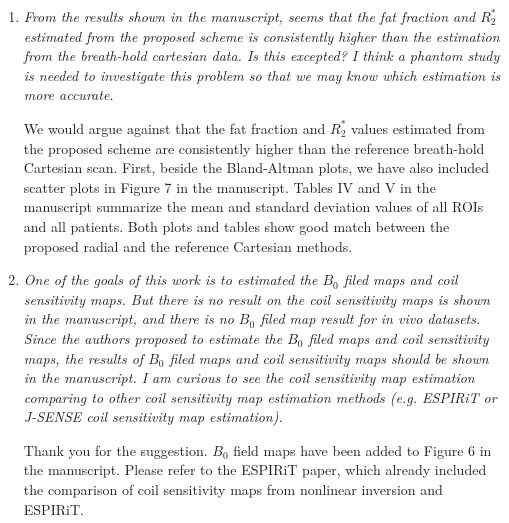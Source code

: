 \documentclass[a4paper,11pt]{report}
\begin{document}
\begin{enumerate}
	\item \textit{From the results shown in the manuscript, seems that the fat fraction and $R_2^*$ estimated from the proposed scheme is consistently higher than the estimation from the breath-hold cartesian data. Is this excepted? I think a phantom study is needed to investigate this problem so that we may know which estimation is more accurate.}

\hspace{1em} We would argue against that the fat fraction and $R_2^*$ values 
estimated from the proposed scheme are consistently higher than 
the reference breath-hold Cartesian scan. First, beside the Bland-Altman plots, 
we have also included scatter plots in Figure 7 in the manuscript. 
Tables IV and V in the manuscript summarize the mean and standard deviation values 
of all ROIs and all patients. 
Both plots and tables show good match between the proposed radial and the reference Cartesian methods.

	\item \textit{One of the goals of this work is to estimated the $B_0$ filed maps and coil sensitivity maps. But there is no result on the coil sensitivity maps is shown in the manuscript, and there is no $B_0$ filed map result for in vivo datasets. Since the authors proposed to estimate the $B_0$ filed maps and coil sensitivity maps, the results of $B_0$ filed maps and coil sensitivity maps should be shown in the manuscript. I am curious to see the coil sensitivity map estimation comparing to other coil sensitivity map estimation methods (e.g. ESPIRiT or J-SENSE coil sensitivity map estimation).}

\hspace{1em} Thank you for the suggestion. $B_0$ field maps have been added to Figure 6 in the manuscript. 
Please refer to the ESPIRiT paper, 
which already included the comparison of coil sensitivity maps 
from nonlinear inversion and ESPIRiT.




\end{enumerate}
\end{document}

